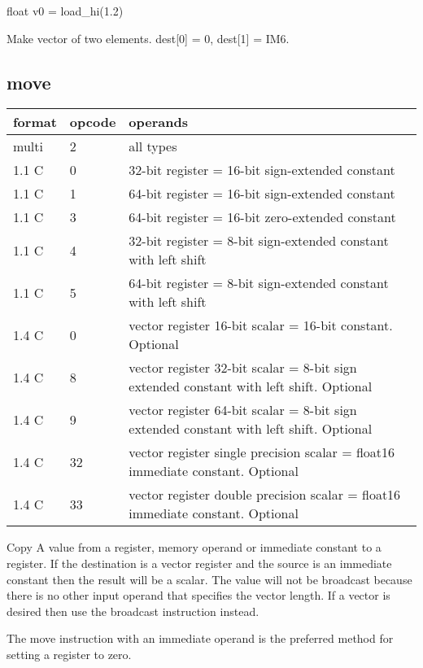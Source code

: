 \documentclass[forwardcom.tex]{subfiles}
\begin{document}
float v0 = load\_hi(1.2)
\vv

Make vector of two elements. dest[0] = 0, dest[1] = IM6.
\vv

\subsection{move}
\label{table:moveInstruction}
\begin{tabular}{|p{12mm}|p{15mm}|p{100mm}|}
\hline
\bfseries format & \bfseries opcode & \bfseries operands \\ \hline
multi &  2 & all types \\ \hline
1.1 C &  0 & 32-bit register = 16-bit sign-extended constant \\ \hline
1.1 C &  1 & 64-bit register = 16-bit sign-extended constant \\ \hline
1.1 C &  3 & 64-bit register = 16-bit zero-extended constant \\ \hline
1.1 C &  4 & 32-bit register = 8-bit sign-extended constant with left shift \\ \hline
1.1 C &  5 & 64-bit register = 8-bit sign-extended constant with left shift \\ \hline
1.4 C &  0 & vector register 16-bit scalar = 16-bit constant. Optional  \\ \hline
1.4 C &  8 & vector register 32-bit scalar = 8-bit sign extended constant with left shift. Optional \\ \hline
1.4 C &  9 & vector register 64-bit scalar = 8-bit sign extended constant with left shift. Optional \\ \hline
1.4 C & 32 & vector register single precision scalar = float16 immediate constant. Optional \\ \hline
1.4 C & 33 & vector register double precision scalar = float16 immediate constant. Optional \\ \hline
\end{tabular}
\vv

Copy A value from a register, memory operand or immediate constant to a register. If the destination is a vector register and the source is an immediate constant then the result will be a scalar. The value will not be broadcast because there is no other input operand that specifies the vector length. If a vector is desired then use the broadcast instruction instead.
\vv

The move instruction with an immediate operand is the preferred method for setting a register to zero.
\vv
\end{document}

